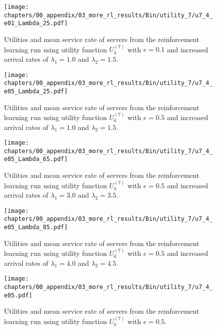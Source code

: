 \begin{figure}[H]
    \texttt{[image: chapters/00\_appendix/03\_more\_rl\_results/Bin/utility\_7/u7\_4\_e01\_Lambda\_25.pdf]}
    \caption{Utilities and mean service rate of servers from the reinforcement
    learning run using utility function \(U_k^{(7)}\) with \(e = 0.1\) and
    increased arrival rates of \(\lambda_1 = 1.0\) and \(\lambda_2 = 1.5\).}
    \label{fig:RL_utility7_4_e01_Lambda_25}
\end{figure}

\begin{figure}[H]
    \texttt{[image: chapters/00\_appendix/03\_more\_rl\_results/Bin/utility\_7/u7\_4\_e05\_Lambda\_25.pdf]}
    \caption{Utilities and mean service rate of servers from the reinforcement
    learning run using utility function \(U_k^{(7)}\) with \(e = 0.5\) and
    increased arrival rates of \(\lambda_1 = 1.0\) and \(\lambda_2 = 1.5\).}
    \label{fig:RL_utility7_4_e05_Lambda_25}
\end{figure}

\begin{figure}[H]
    \texttt{[image: chapters/00\_appendix/03\_more\_rl\_results/Bin/utility\_7/u7\_4\_e05\_Lambda\_65.pdf]}
    \caption{Utilities and mean service rate of servers from the reinforcement
    learning run using utility function \(U_k^{(7)}\) with \(e = 0.5\) and
    increased arrival rates of \(\lambda_1 = 3.0\) and \(\lambda_2 = 3.5\).}
    \label{fig:RL_utility7_4_e05_Lambda_65}
\end{figure}

\begin{figure}[H]
    \texttt{[image: chapters/00\_appendix/03\_more\_rl\_results/Bin/utility\_7/u7\_4\_e05\_Lambda\_85.pdf]}
    \caption{Utilities and mean service rate of servers from the reinforcement
    learning run using utility function \(U_k^{(7)}\) with \(e = 0.5\) and
    increased arrival rates of \(\lambda_1 = 4.0\) and \(\lambda_2 = 4.5\).}
    \label{fig:RL_utility7_4_e05_Lambda_85}
\end{figure}

\begin{figure}[H]
    \texttt{[image: chapters/00\_appendix/03\_more\_rl\_results/Bin/utility\_7/u7\_4\_e05.pdf]}
    \caption{Utilities and mean service rate of servers from the reinforcement
    learning run using utility function \(U_k^{(7)}\) with \(e = 0.5\).}
    \label{fig:RL_utility7_4_e05}
\end{figure}

